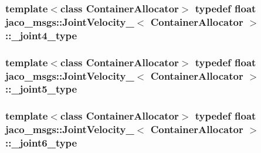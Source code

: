 \subsubsection[{\texorpdfstring{\+\_\+joint4\+\_\+type}{_joint4_type}}]{\setlength{\rightskip}{0pt plus 5cm}template$<$class Container\+Allocator$>$ typedef float {\bf jaco\+\_\+msgs\+::\+Joint\+Velocity\+\_\+}$<$ Container\+Allocator $>$\+::{\bf \+\_\+joint4\+\_\+type}}\hypertarget{structjaco__msgs_1_1JointVelocity___a5433af2aa782711e694f2dea934d1e8a}{}\label{structjaco__msgs_1_1JointVelocity___a5433af2aa782711e694f2dea934d1e8a}
\subsubsection[{\texorpdfstring{\+\_\+joint5\+\_\+type}{_joint5_type}}]{\setlength{\rightskip}{0pt plus 5cm}template$<$class Container\+Allocator$>$ typedef float {\bf jaco\+\_\+msgs\+::\+Joint\+Velocity\+\_\+}$<$ Container\+Allocator $>$\+::{\bf \+\_\+joint5\+\_\+type}}\hypertarget{structjaco__msgs_1_1JointVelocity___a994fb0216a13a4bac0b44d75b293c8d1}{}\label{structjaco__msgs_1_1JointVelocity___a994fb0216a13a4bac0b44d75b293c8d1}
\subsubsection[{\texorpdfstring{\+\_\+joint6\+\_\+type}{_joint6_type}}]{\setlength{\rightskip}{0pt plus 5cm}template$<$class Container\+Allocator$>$ typedef float {\bf jaco\+\_\+msgs\+::\+Joint\+Velocity\+\_\+}$<$ Container\+Allocator $>$\+::{\bf \+\_\+joint6\+\_\+type}}\hypertarget{structjaco__msgs_1_1JointVelocity___aa08791b2618486b98789028edc8fecd7}{}\label{structjaco__msgs_1_1JointVelocity___aa08791b2618486b98789028edc8fecd7}
